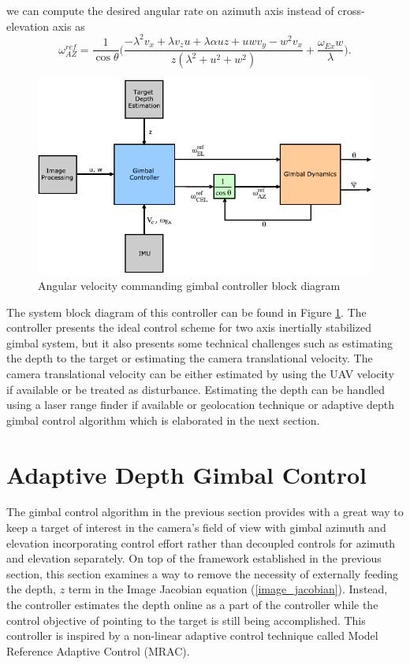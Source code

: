 we can compute the desired angular rate on azimuth axis instead of cross-elevation axis as
\begin{equation}
\omega_{AZ}^{ref}=\frac{1}{\cos \theta}\bigg(\frac{-\lambda^2 v_x+\lambda v_z u+\lambda \alpha uz +uwv_y -w^2 v_x}{z(\lambda^2+u^2+w^2)}+\frac{\omega_{Ex}w}{\lambda}\bigg).
\end{equation}
\begin{figure}[t]
	\centering
	\includegraphics[width = 5in]{images/chapter2/gp_blockdiagram.pdf}
	\caption{Angular velocity commanding gimbal controller block diagram}
	\label{avcg_blockdiagram}
\end{figure}
The system block diagram of this controller can be found in Figure \ref{avcg_blockdiagram}. The controller presents the ideal control scheme for two axis inertially stabilized gimbal system, but it also presents some technical challenges such as estimating the depth to the target or estimating the camera translational velocity. The camera translational velocity can be either estimated by using the UAV velocity if available or be treated as disturbance. Estimating the depth can be handled using a laser range finder if available or geolocation technique or adaptive depth gimbal control algorithm which is elaborated in the next section.

\section{Adaptive Depth Gimbal Control}
The gimbal control algorithm in the previous section provides with a great way to keep a target of interest in the camera's field of view with gimbal azimuth and elevation incorporating control effort rather than decoupled controls for azimuth and elevation separately. On top of the framework established in the previous section, this section examines a way to remove the necessity of externally feeding the depth, $z$ term in the Image Jacobian equation (\ref{image_jacobian}). Instead, the controller estimates the depth online as a part of the controller while the control objective of pointing to the target is still being accomplished. This controller is inspired by a non-linear adaptive control technique called Model Reference Adaptive Control (MRAC).
